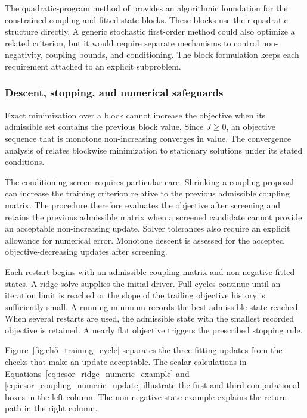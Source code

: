 The quadratic-program method of \citet{Stellato2018} provides an algorithmic foundation for the constrained coupling and fitted-state blocks. These blocks use their quadratic structure directly. A generic stochastic first-order method could also optimize a related criterion, but it would require separate mechanisms to control non-negativity, coupling bounds, and conditioning. The block formulation keeps each requirement attached to an explicit subproblem.

\subsubsection{Descent, stopping, and numerical safeguards}

Exact minimization over a block cannot increase the objective when its admissible set contains the previous block value. Since \(J\geq0\), an objective sequence that is monotone non-increasing converges in value. The convergence analysis of \citet{Razaviyayn2013} relates blockwise minimization to stationary solutions under its stated conditions.

The conditioning screen requires particular care. Shrinking a coupling proposal can increase the training criterion relative to the previous admissible coupling matrix. The procedure therefore evaluates the objective after screening and retains the previous admissible matrix when a screened candidate cannot provide an acceptable non-increasing update. Solver tolerances also require an explicit allowance for numerical error. Monotone descent is assessed for the accepted objective-decreasing updates after screening.

Each restart begins with an admissible coupling matrix and non-negative fitted states. A ridge solve supplies the initial driver. Full cycles continue until an iteration limit is reached or the slope of the trailing objective history is sufficiently small. A running minimum records the best admissible state reached. When several restarts are used, the admissible state with the smallest recorded objective is retained. A nearly flat objective triggers the prescribed stopping rule.

Figure~\ref{fig:ch5_training_cycle} separates the three fitting updates from the checks that make an update acceptable. The scalar calculations in Equations~\eqref{eq:icsor_ridge_numeric_example} and \eqref{eq:icsor_coupling_numeric_update} illustrate the first and third computational boxes in the left column. The non-negative-state example explains the return path in the right column.

